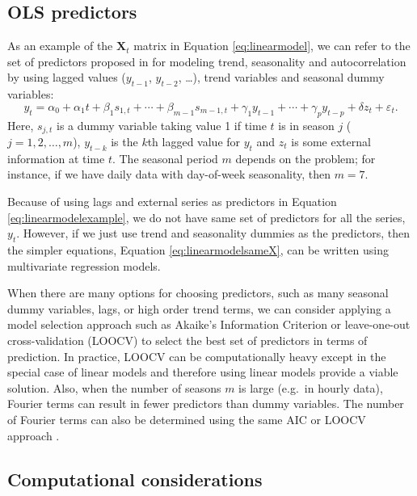 \documentclass[11pt,a4paper,]{article}
\begin{document}
\hypertarget{ols-predictors}{%
\subsection{OLS predictors}\label{ols-predictors}}

As an example of the \(\bm{X}_t\) matrix in Equation \eqref{eq:linearmodel}, we can refer to the set of predictors proposed in \textcite{ashouri2018} for modeling trend, seasonality and autocorrelation by using lagged values (\(y_{t-1}\), \(y_{t-2}\), \dots), trend variables and seasonal dummy variables:
\begin{equation}\label{eq:linearmodelexample}
   y_t = \alpha_0 + \alpha_1 t + \beta_1 s_{1,t} + \cdots + \beta_{m-1} s_{m-1,t} + \gamma_1 y_{t-1} + \cdots + \gamma_p y_{t-p} + \delta z_t + \varepsilon_t.
\end{equation}
Here, \(s_{j,t}\) is a dummy variable taking value 1 if time \(t\) is in season \(j\) (\(j=1, 2, \dots, m\)), \(y_{t-k}\) is the \(k\)th lagged value for \(y_t\) and \(z_t\) is some external information at time \(t\). The seasonal period \(m\) depends on the problem; for instance, if we have daily data with day-of-week seasonality, then \(m=7\).

Because of using lags and external series as predictors in Equation \eqref{eq:linearmodelexample}, we do not have same set of predictors for all the series, \(y_t\). However, if we just use trend and seasonality dummies as the predictors, then the simpler equations, Equation \eqref{eq:linearmodelsameX}, can be written using multivariate regression models.

When there are many options for choosing predictors, such as many seasonal dummy variables, lags, or high order trend terms, we can consider applying a model selection approach such as Akaike's Information Criterion or leave-one-out cross-validation (LOOCV) to select the best set of predictors in terms of prediction. In practice, LOOCV can be computationally heavy except in the special case of linear models \autocite{christensenplane} and therefore using linear models provide a viable solution. Also, when the number of seasons \(m\) is large (e.g.~in hourly data), Fourier terms can result in fewer predictors than dummy variables. The number of Fourier terms can also be determined using the same AIC or LOOCV approach \autocite{fpp2}.

\hypertarget{computational-considerations}{%
\subsection{\texorpdfstring{Computational considerations \label{sec:computationalconsiderations}}{Computational considerations }}\label{computational-considerations}}
\end{document}
